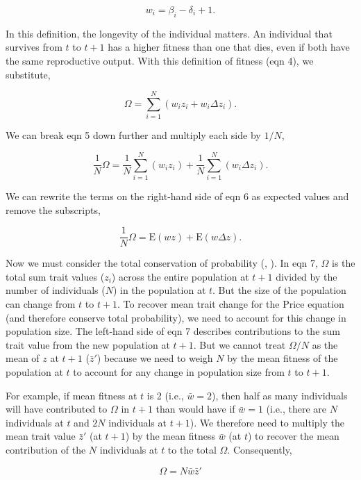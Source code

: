 \documentclass[
]{article}
\begin{document}
\[w_{i} = \beta_{i} - \delta_{i} + 1.
\tag{4}
\]

In this definition, the longevity of the individual matters. An
individual that survives from \(t\) to \(t + 1\) has a higher fitness
than one that dies, even if both have the same reproductive output. With
this definition of fitness (eqn 4), we substitute,

\[\Omega = \sum_{i=1}^{N} \left(w_{i}z_{i} + w_{i}\Delta z_{i} \right).
\tag{5}
\]

We can break eqn 5 down further and multiply each side by \(1/N\),

\[\frac{1}{N}\Omega = \frac{1}{N}\sum_{i=1}^{N} \left(w_{i}z_{i} \right) + \frac{1}{N}\sum_{i=1}^{N}\left( w_{i}\Delta z_{i} \right).
\tag{6}
\]

We can rewrite the terms on the right-hand side of eqn 6 as expected
values and remove the subscripts,

\[\frac{1}{N}\Omega = \mathrm{E}\left(w z \right) + \mathrm{E}\left( w \Delta z  \right).
\tag{7}
\]

Now we must consider the total conservation of probability
(, ).
In eqn 7, \(\Omega\) is the total sum trait values (\(z_{i}\)) across
the entire population at \(t + 1\) divided by the number of individuals
(\(N\)) in the population at \(t\). But the size of the population can
change from \(t\) to \(t + 1\). To recover mean trait change for the
Price equation (and therefore conserve total probability), we need to
account for this change in population size. The left-hand side of eqn 7
describes contributions to the sum trait value from the new population
at \(t + 1\). But we cannot treat \(\Omega/N\) as the mean of \(z\) at
\(t+1\) (\(\bar{z}'\)) because we need to weigh \(N\) by the mean
fitness of the population at \(t\) to account for any change in
population size from \(t\) to \(t+1\).

For example, if mean fitness at \(t\) is 2 (i.e., \(\bar{w} = 2\)), then
half as many individuals will have contributed to \(\Omega\) in
\(t + 1\) than would have if \(\bar{w} = 1\) (i.e., there are \(N\)
individuals at \(t\) and \(2N\) individuals at \(t + 1\)). We therefore
need to multiply the mean trait value \(\bar{z}'\) (at \(t + 1\)) by the
mean fitness \(\bar{w}\) (at \(t\)) to recover the mean contribution of
the \(N\) individuals at \(t\) to the total \(\Omega\). Consequently,

\[\Omega = N\bar{w}\bar{z}'
\tag{8}
\]
\end{document}
